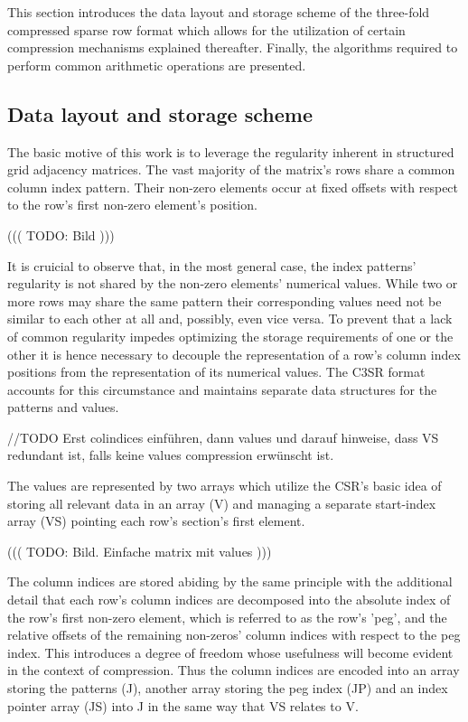 \documentclass{article}
\begin{document}
  This section introduces the data layout and storage scheme of the three-fold compressed sparse row format which allows
  for the utilization of certain compression mechanisms explained thereafter. Finally, the algorithms required to
  perform common arithmetic operations are presented.

  \subsection{Data layout and storage scheme}

    The basic motive of this work is to leverage the regularity inherent in structured grid adjacency matrices. The vast
    majority of the matrix's rows share a common column index pattern. Their non-zero elements occur at fixed offsets
    with respect to the row's first non-zero element's position.

      ((( TODO: Bild )))

    It is cruicial to observe that, in the most general case, the index patterns' regularity is not shared by the
    non-zero elements' numerical values. While two or more rows may share the same pattern their corresponding values
    need not be similar to each other at all and, possibly, even vice versa. To prevent that a lack of common regularity
    impedes optimizing the storage requirements of one or the other it is hence necessary to decouple the representation
    of a row's column index positions from the representation of its numerical values. The C3SR format accounts for this
    circumstance and maintains separate data structures for the patterns and values.

    //TODO Erst colindices einführen, dann values und darauf hinweise, dass VS redundant ist, falls keine values
    compression erwünscht ist.

    The values are represented by two arrays which utilize the CSR's basic idea of storing all relevant data in an
    array (V) and managing a separate start-index array (VS) pointing each row's section's first element.

      ((( TODO: Bild. Einfache matrix mit values )))

    The column indices are stored abiding by the same principle with the additional detail that each row's column
    indices are decomposed into the absolute index of the row's first non-zero element, which is referred to as the
    row's 'peg', and the relative offsets of the remaining non-zeros' column indices with respect to the peg index.
    This introduces a degree of freedom whose usefulness will become evident in the context of compression. Thus the
    column indices are encoded into an array storing the patterns (J), another array storing the peg index (JP)
    and an index pointer array (JS) into J in the same way that VS relates to V.
\end{document}

